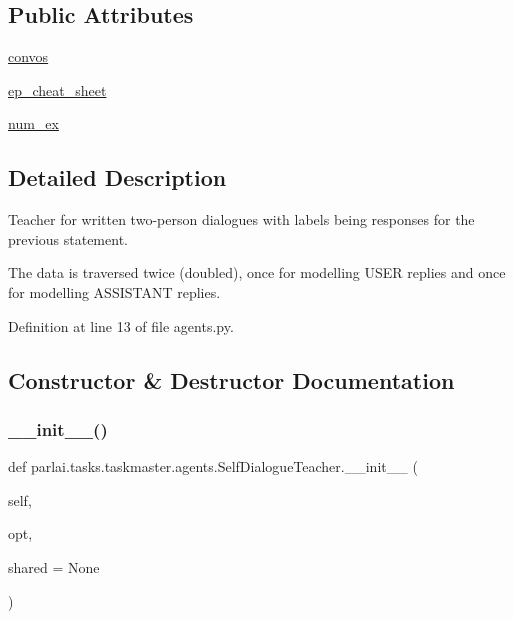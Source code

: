 \subsection*{Public Attributes}
\begin{DoxyCompactItemize}
\item 
\hyperlink{classparlai_1_1tasks_1_1taskmaster_1_1agents_1_1SelfDialogueTeacher_a6a5215f1c64623de6962a32b95f27fac}{convos}
\item 
\hyperlink{classparlai_1_1tasks_1_1taskmaster_1_1agents_1_1SelfDialogueTeacher_ac8110082f9ce0736ff129f93cf7740c1}{ep\+\_\+cheat\+\_\+sheet}
\item 
\hyperlink{classparlai_1_1tasks_1_1taskmaster_1_1agents_1_1SelfDialogueTeacher_a8a3fced952427353aba96b59a8efe0d2}{num\+\_\+ex}
\end{DoxyCompactItemize}


\subsection{Detailed Description}
\begin{DoxyVerb}Teacher for written two-person dialogues with labels being responses for the
previous statement.

The data is traversed twice (doubled), once for modelling USER replies and once for
modelling ASSISTANT replies.
\end{DoxyVerb}
 

Definition at line 13 of file agents.\+py.



\subsection{Constructor \& Destructor Documentation}
\mbox{\label{classparlai_1_1tasks_1_1taskmaster_1_1agents_1_1SelfDialogueTeacher_a32491a46f580811d074f1a2566793fc4}} 
\subsubsection{\texorpdfstring{\+\_\+\+\_\+init\+\_\+\+\_\+()}{\_\_init\_\_()}}
{\footnotesize\ttfamily def parlai.\+tasks.\+taskmaster.\+agents.\+Self\+Dialogue\+Teacher.\+\_\+\+\_\+init\+\_\+\+\_\+ (\begin{DoxyParamCaption}\item[{}]{self,  }\item[{}]{opt,  }\item[{}]{shared = {\ttfamily None} }\end{DoxyParamCaption})}



